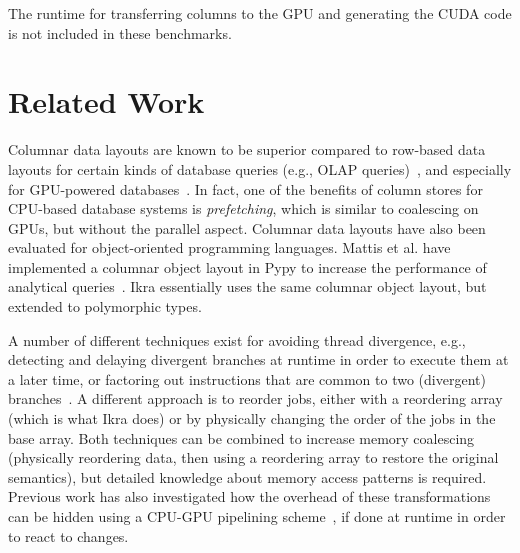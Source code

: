 \documentclass[preprint]{sigplanconf}
\begin{document}
The runtime for transferring columns to the GPU and generating the CUDA code is not included in these benchmarks.

\section{Related Work}
Columnar data layouts are known to be superior compared to row-based data layouts for certain kinds of database queries (e.g., OLAP queries)~\cite{Plattner:2009:CDA:1559845.1559846}, and especially for GPU-powered databases~\cite{Bakkum:2010:ASD:1735688.1735706}. In fact, one of the benefits of column stores for CPU-based database systems is \emph{prefetching}, which is similar to coalescing on GPUs, but without the parallel aspect. Columnar data layouts have also been evaluated for object-oriented programming languages. Mattis et al. have implemented a columnar object layout in Pypy to increase the performance of analytical queries~\cite{Mattis:2015:COI:2814228.2814230}. Ikra essentially uses the same columnar object layout, but extended to polymorphic types.

A number of different techniques exist for avoiding thread divergence, e.g., detecting and delaying divergent branches at runtime in order to execute them at a later time, or factoring out instructions that are common to two (divergent) branches~\cite{Han:2011:RBD:1964179.1964184}. A different approach is to reorder jobs, either with a reordering array (which is what Ikra does) or by physically changing the order of the jobs in the base array. Both techniques can be combined to increase memory coalescing~\cite{Zhang:2011:OED:1950365.1950408} (physically reordering data, then using a reordering array to restore the original semantics), but detailed knowledge about memory access patterns is required. Previous work has also investigated how the overhead of these transformations can be hidden using a CPU-GPU pipelining scheme~\cite{Zhang:2010:SGA:1810085.1810104}, if done at runtime in order to react to changes.
\end{document}
